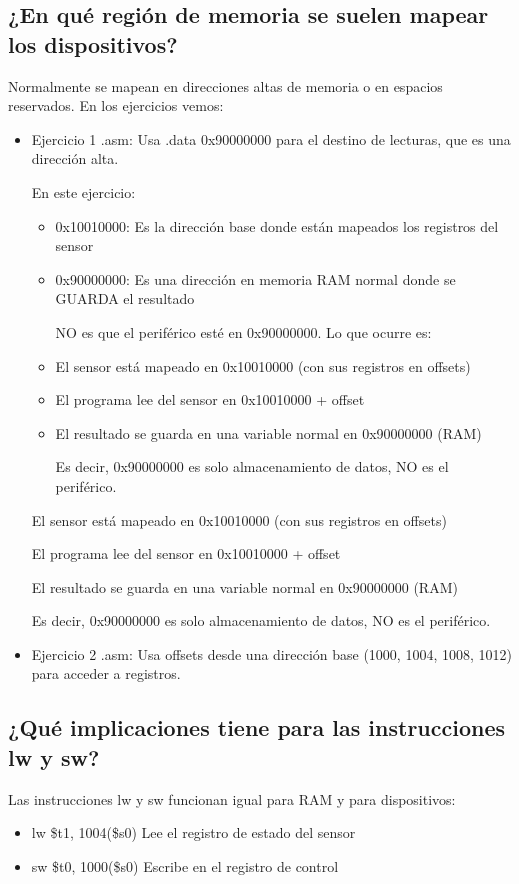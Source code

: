 \documentclass{article}
\begin{document}
\subsection{¿En qué región de memoria se suelen mapear los dispositivos?}

Normalmente se mapean en direcciones altas de memoria o en espacios reservados. En los ejercicios vemos:
\begin{itemize}
    \item Ejercicio 1 .asm: Usa .data 0x90000000 para el destino de lecturas, que es una dirección alta.
    
    En este ejercicio:
    \begin{itemize}
        \item     0x10010000: Es la dirección base donde están mapeados los registros del sensor

        \item 0x90000000: Es una dirección en memoria RAM normal donde se GUARDA el resultado

        NO es que el periférico esté en 0x90000000. Lo que ocurre es:

        \item El sensor está mapeado en 0x10010000 (con sus registros en offsets)

        \item El programa lee del sensor en 0x10010000 + offset

        \item El resultado se guarda en una variable normal en 0x90000000 (RAM)

    Es decir, 0x90000000 es solo almacenamiento de datos, NO es el periférico.
    \end{itemize}

    El sensor está mapeado en 0x10010000 (con sus registros en offsets)

    El programa lee del sensor en 0x10010000 + offset

    El resultado se guarda en una variable normal en 0x90000000 (RAM)

    Es decir, 0x90000000 es solo almacenamiento de datos, NO es el periférico.

    \item Ejercicio 2 .asm: Usa offsets desde una dirección base (1000, 1004, 1008, 1012) para acceder a registros.
\end{itemize}
\subsection{¿Qué implicaciones tiene para las instrucciones lw y sw?}
Las instrucciones lw y sw funcionan igual para RAM y para dispositivos:
\begin{itemize}
    \item lw \$t1, 1004(\$s0)   Lee el registro de estado del sensor

    \item sw \$t0, 1000(\$s0)   Escribe en el registro de control
\end{itemize}
\end{document}
